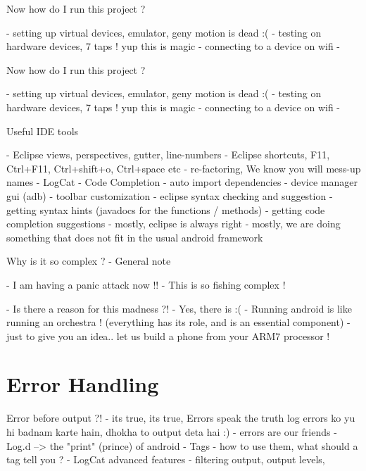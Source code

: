 \documentclass[11pt]{beamer}
\begin{document}
\begin{frame}[containsverbatim]{Now how do I run this project ?}

- setting up virtual devices, emulator, geny motion is dead :(
- testing on hardware devices, 7 taps ! yup this is magic
- connecting to a device on wifi 
- 
\end{frame}

\begin{frame}[containsverbatim]{Now how do I run this project ?}

- setting up virtual devices, emulator, geny motion is dead :(
- testing on hardware devices, 7 taps ! yup this is magic
- connecting to a device on wifi 
- 
\end{frame}


\begin{frame}[containsverbatim]{Useful IDE tools}

- Eclipse views, perspectives, gutter, line-numbers
- Eclipse shortcuts, F11, Ctrl+F11, Ctrl+shift+o, Ctrl+space etc
- re-factoring, We know you will mess-up names
- LogCat
- Code Completion
- auto import dependencies
- device manager gui (adb)
- toolbar customization
- eclipse syntax checking and suggestion
- getting syntax hints (javadocs for the functions / methods)
- getting code completion suggestions
- mostly, eclipse is always right
- mostly, we are doing something that does not fit in the usual android framework

\end{frame}


\begin{frame}[containsverbatim]{Why is it so complex ? - General note}

- I am having a panic attack now !!
- This is so fishing complex ! 

- Is there a reason for this madness ?!
- Yes, there is :(
- Running android is like running an orchestra !
(everything has its role, and is an essential component)
- just to give you an idea.. let us build a phone from your ARM7 processor !

\end{frame}

\section{Error Handling}

\begin{frame}[containsverbatim]{Error before output ?!}
- its true, its true, Errors speak the truth
log errors ko yu hi badnam karte hain, dhokha to output deta hai :)
- errors are our friends
- Log.d --> the "print" (prince) of android 
- Tags - how to use them, what should a tag tell you ?
- LogCat advanced features - filtering output, output levels, 

\end{frame}
\end{document}
